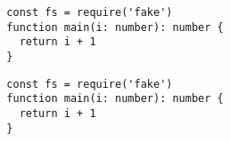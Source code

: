 \documentclass{article}
\begin{document}
\begin{verbatim}
  const fs = require('fake')
  function main(i: number): number {
    return i + 1
  }
\end{verbatim}

\begin{verbatim}
  const fs = require('fake')
  function main(i: number): number {
    return i + 1
  }
\end{verbatim}
\end{document}
